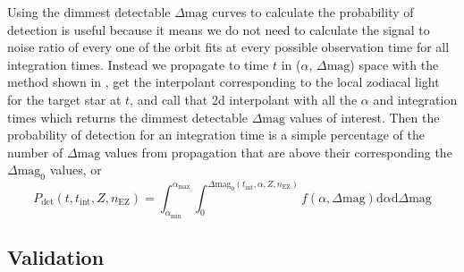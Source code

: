 Using the dimmest detectable $\Delta\textrm{mag}$ curves to calculate
the probability of detection is useful because it means we do not need to calculate
the signal to noise ratio of every one of the orbit fits at every possible
observation time for all integration times. Instead we propagate to time $t$ in
($\alpha$, $\Delta\textrm{mag}$) space with the method shown in
, get the interpolant corresponding to the local zodiacal
light for the target star at $t$, and call that 2d interpolant with all the
$\alpha$ and integration times which returns the dimmest detectable
$\Delta\textrm{mag}$ values of interest. Then the probability of detection for
an integration time is a simple percentage of the number of
$\Delta\textrm{mag}$ values from propagation that are above their corresponding
the $\Delta\textrm{mag}_0$ values, or
\begin{equation}
  P_\textrm{det}(t, t_\textrm{int}, Z, n_\textrm{EZ}) = 
  \int_{\alpha_\textrm{min}}^{\alpha_\textrm{max}} 
  \int_{0}^{\Delta\textrm{mag}_0(t_\textrm{int}, \alpha, Z, n_\textrm{EZ})}
  f(\alpha, \Delta\textrm{mag})\textrm{d}\alpha \textrm{d}\Delta\textrm{mag}
  \label{eq:comp_integral}
\end{equation}

\subsection{Validation}

